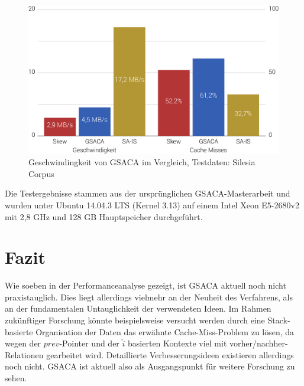 \documentclass[twoside,a4paper,11pt]{article}
\theoremstyle{break}
\begin{document}
\begin{figure}[h]
	\centering
	\includegraphics[width=0.6\linewidth,bb=0 0 830 495]{./assets/performance.pdf}
	\caption{Geschwindingkeit von GSACA im Vergleich, Testdaten: Silesia Corpus}
\label{fig:performance}
\end{figure}

Die Testergebnisse stammen aus der ursprünglichen GSACA-Masterarbeit und wurden unter Ubuntu 14.04.3 LTS (Kernel 3.13) auf einem Intel Xeon E5-2680v2 mit 2,8 GHz und 128 GB Hauptspeicher durchgeführt.

\section{Fazit}

Wie soeben in der Performanceanalyse gezeigt, ist GSACA aktuell noch nicht praxistauglich. Dies liegt allerdings vielmehr an der Neuheit des Verfahrens, als an der fundamentalen Untauglichkeit der verwendeten Ideen. Im Rahmen zukünftiger Forschung könnte beispielsweise versucht werden durch eine Stack-basierte Organisation der Daten das erwähnte Cache-Miss-Problem zu lösen, da wegen der $prev$-Pointer und der $\widehat{i}$ basierten Kontexte viel mit vorher/nachher-Relationen gearbeitet wird. Detaillierte Verbesserungsideen existieren allerdings noch nicht. GSACA ist aktuell also als Ausgangspunkt für weitere Forschung zu sehen.



\end{document}
